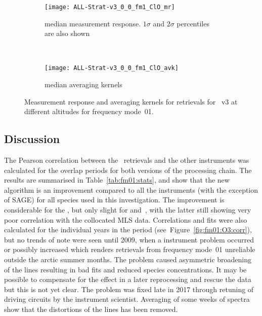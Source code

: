 \begin{figure}[tbhp]
    \centering
    \begin{subfigure}[b]{0.49\textwidth}
        \texttt{[image: ALL-Strat-v3\_0\_0\_fm1\_ClO\_mr]}
        \caption{median measurement response.  $1\sigma$ and $2\sigma$
        percentiles are also shown}
        \label{fig:fm01:ClO:mr}
    \end{subfigure}
    \,
    \begin{subfigure}[b]{0.49\textwidth}
        \texttt{[image: ALL-Strat-v3\_0\_0\_fm1\_ClO\_avk]}
        \caption{median averaging kernels\newline~}
        \label{fig:fm01:ClO:avk}
    \end{subfigure}
    \caption{Measurement response and averaging kernels for 
    retrievals for \smr~v3 at different altitudes for frequency mode~01.}
    \label{fig:fm01:ClO:mr_avk}
\end{figure}


\subsection{Discussion}
\label{sec:fm01:discussion}
The Pearson correlation between the \smr\ retrievals and the other instruments
was calculated for the overlap periods for both versions of the processing
chain.  The results are summarised in Table~\ref{tab:fm01:stats}, and show that
the new algorithm is an improvement compared to all the instruments (with the
exception of SAGE) for all species used in this investigation. The improvement
is considerable for the , but only slight for 
and~, with the latter still showing very poor correlation with the
collocated MLS data. Correlations and fits were also calculated for the
individual years in the period (see~Figure~\ref{fig:fm01:O3:corr}), but no
trends of note were seen until 2009, when a instrument problem occurred or
possibly increased which renders retrievals from frequency mode~01 unreliable
outside the arctic summer months.  The problem caused asymmetric broadening of
the lines resulting in bad fits and reduced species concentrations. It may be
possible to compensate for the effect in a later reprocessing and rescue the
data but this is not yet clear. The problem was fixed late in 2017 through
retuning of driving circuits by the instrument scientist.  Averaging of some
weeks of spectra show that the distortions of the lines has been removed.


